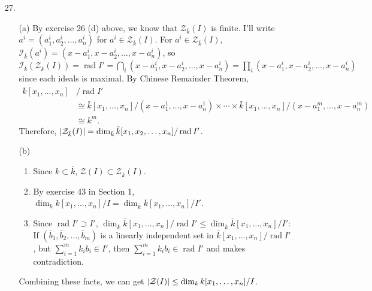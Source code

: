 \documentclass[12pt]{article}
\DeclareMathOperator{\rad}{\mathrm{rad}}
\newcommand{\I}{\mathcal{I}}
\newcommand{\Z}{\mathcal{Z}}
\begin{document}
\begin{enumerate}
\item[27.] \begin{enumerate}\item[(a)]
By exercise 26 (d) above, we know that $\Z_{\bar{k}}(I)$ is finite. I'll write $a^i=(a_1^i, a_2^i, \ldots, a_n^i)$ for $a^i\in \Z_{\bar{k}}(I)$. For $a^i\in  \Z_{\bar{k}}(I)$, $\I_{\bar{k}}(a^i)=(x-a^i_1, x-a^i_2, \ldots, x-a^i_n)$, so $\I_{\bar{k}}\left(\Z_{\bar{k}}(I)\right)=\rad I'=\bigcap_i (x-a^i_1, x-a^i_2, \ldots, x-a^i_n)=\prod_i (x-a^i_1, x-a^i_2, \ldots, x-a^i_n)$ since each ideals is maximal. By Chinese Remainder Theorem,
\begin{equation*}
\begin{split}
\bar{k}[x_1, \ldots, x_n]&/\rad I'\\
&\cong \bar{k}[x_1, \ldots, x_n]/(x-a^1_1, \ldots, x-a^1_n) \times \cdots \times \bar{k}[x_1, \ldots, x_n]/(x-a^m_1, \ldots, x-a^m_n)\\
&\cong k^m.
\end{split}
\end{equation*}
Therefore, $\abs{\Z_{\bar{k}}(I)}=\dim_{\bar{k}}\bar{k}[x_1, x_2, \ldots, x_n]/\rad I'$.
\item[(b)] \begin{enumerate}
\item Since $k\subset \bar{k}$, $\Z(I)\subset \Z_{\bar{k}}(I)$. 
\item By exercise 43 in Section 1, $\dim_k k[x_1, \ldots, x_n]/I=\dim_{\bar{k}} \bar{k}[x_1, \ldots, x_n]/I'$.
\item Since $\rad I'\supset I'$, $\dim_{\bar{k}} \bar{k}[x_1, \ldots, x_n]/\rad I'\leq \dim_{\bar{k}} \bar{k}[x_1, \ldots, x_n]/ I'$: If $(\bar{b}_1, \bar{b}_2, \ldots, \bar{b}_m)$ is a linearly independent set in $\bar{k}[x_1, \ldots, x_n]/\rad I'$, but $\sum_{i=1}^m k_i b_i \in I'$, then $\sum_{i=1}^m k_i b_i\in \rad I'$ and makes contradiction.
\end{enumerate}
Combining these facts, we can get $\abs{\Z(I)}\leq \dim_k k[x_1, \ldots, x_n]/I$.
\end{enumerate}
\end{enumerate}
\end{document}
